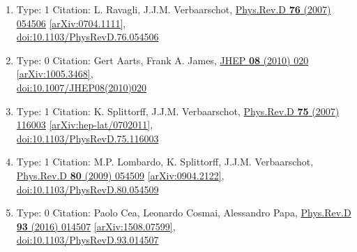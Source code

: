 \documentclass[a4paper,10pt]{article}
\begin{document}
\begin{enumerate}
\begin{enumerate}
  \item Type: 1 Citation: L. Ravagli, J.J.M. Verbaarschot, \href{https://www.doi.org/10.1103/PhysRevD.76.054506}{Phys.Rev.D {\bf 76} (2007) 054506}  \href{https://arxiv.org/abs/0704.1111}{[arXiv:0704.1111]},\\\href{https://www.doi.org/10.1103/PhysRevD.76.054506}{doi:10.1103/PhysRevD.76.054506}
  \item Type: 0 Citation: Gert Aarts, Frank A. James, \href{https://www.doi.org/10.1007/JHEP08(2010)020}{JHEP {\bf 08} (2010) 020}  \href{https://arxiv.org/abs/1005.3468}{[arXiv:1005.3468]},\\\href{https://www.doi.org/10.1007/JHEP08(2010)020}{doi:10.1007/JHEP08(2010)020}
  \item Type: 1 Citation: K. Splittorff, J.J.M. Verbaarschot, \href{https://www.doi.org/10.1103/PhysRevD.75.116003}{Phys.Rev.D {\bf 75} (2007) 116003}  \href{https://arxiv.org/abs/hep-lat/0702011}{[arXiv:hep-lat/0702011]},\\\href{https://www.doi.org/10.1103/PhysRevD.75.116003}{doi:10.1103/PhysRevD.75.116003}
  \item Type: 1 Citation: M.P. Lombardo, K. Splittorff, J.J.M. Verbaarschot, \href{https://www.doi.org/10.1103/PhysRevD.80.054509}{Phys.Rev.D {\bf 80} (2009) 054509}  \href{https://arxiv.org/abs/0904.2122}{[arXiv:0904.2122]},\\\href{https://www.doi.org/10.1103/PhysRevD.80.054509}{doi:10.1103/PhysRevD.80.054509}
  \item Type: 0 Citation: Paolo Cea, Leonardo Cosmai, Alessandro Papa, \href{https://www.doi.org/10.1103/PhysRevD.93.014507}{Phys.Rev.D {\bf 93} (2016) 014507}  \href{https://arxiv.org/abs/1508.07599}{[arXiv:1508.07599]},\\\href{https://www.doi.org/10.1103/PhysRevD.93.014507}{doi:10.1103/PhysRevD.93.014507}

\end{enumerate}
\end{enumerate}
\end{document}
